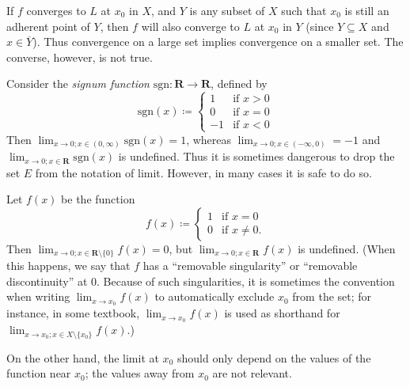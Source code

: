 \begin{note}
    If \(f\) converges to \(L\) at \(x_0\) in \(X\), and \(Y\) is any subset of \(X\) such that \(x_0\) is still an adherent point of \(Y\), then \(f\) will also converge to \(L\) at \(x_0\) in \(Y\)
    (since \(Y \subseteq X\) and \(x \in \overline{Y}\)).
    Thus convergence on a large set implies convergence on a smaller set.
    The converse, however, is not true.
\end{note}

\begin{example}\label{9.3.16}
    Consider the \emph{signum function} \(\text{sgn} : \mathbf{R} \to \mathbf{R}\), defined by
    \[
        \text{sgn}(x) \coloneqq \begin{cases}
            1  & \text{if } x > 0 \\
            0  & \text{if } x = 0 \\
            -1 & \text{if } x < 0
        \end{cases}
    \]
    Then \(\lim_{x \to 0 ; x \in (0, \infty)} \text{sgn}(x) = 1\), whereas \(\lim_{x \to 0 ; x \in (-\infty, 0)} = -1\) and \(\lim_{x \to 0 ; x \in \mathbf{R}} \text{sgn}(x)\) is undefined.
    Thus it is sometimes dangerous to drop the set \(E\) from the notation of limit.
    However, in many cases it is safe to do so.
\end{example}

\begin{example}\label{9.3.17}
    Let \(f(x)\) be the function
    \[
        f(x) \coloneqq \begin{cases}
            1 & \text{if } x = 0     \\
            0 & \text{if } x \neq 0.
        \end{cases}
    \]
    Then \(\lim_{x \to 0 ; x \in \mathbf{R} \setminus \{0\}} f(x) = 0\), but \(\lim_{x \to 0 ; x \in \mathbf{R}} f(x)\) is undefined.
    (When this happens, we say that \(f\) has a ``removable singularity'' or ``removable discontinuity'' at \(0\).
    Because of such singularities, it is sometimes the convention when writing \(\lim_{x \to x_0} f(x)\) to automatically exclude \(x_0\) from the set;
    for instance, in some textbook, \(\lim_{x \to x_0} f(x)\) is used as shorthand for \(\lim_{x \to x_0 ; x \in X \setminus \{x_0\}} f(x)\).)
\end{example}

\begin{note}
    On the other hand, the limit at \(x_0\) should only depend on the values of the function near \(x_0\);
    the values away from \(x_0\) are not relevant.
\end{note}

